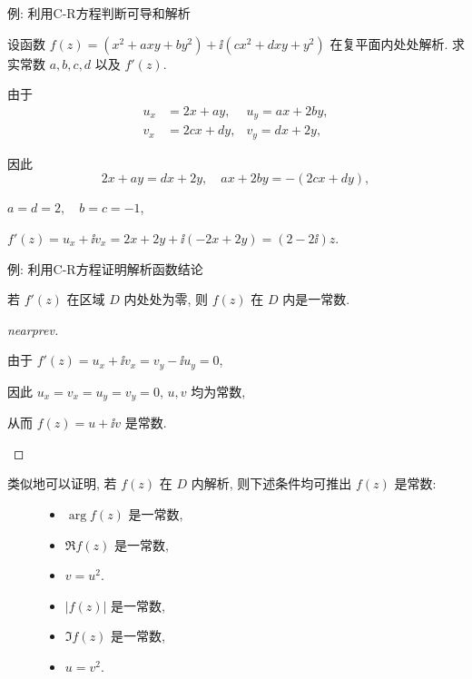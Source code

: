\begin{frame}{例: 利用C-R方程判断可导和解析}
	\onslide<+->
	\begin{example}[nearnext]
		设函数 $f(z)=(x^2+axy+by^2)+\ii(cx^2+dxy+y^2)$ 在复平面内处处解析. 求实常数 $a,b,c,d$ 以及 $f'(z)$.
	\end{example}
	\onslide<+->
	\begin{solution}[nearprev]
		\begin{itemize*}
			\item 由于
			\bigdel
			\begin{align*}
				u_x&=2x+ay,&u_y=ax+2by,\\
				v_x&=2cx+dy,&v_y=dx+2y,
			\end{align*}
			\item 因此
			\[
				2x+ay=dx+2y,\quad ax+2by=-(2cx+dy),
			\]
			\item \centering $a=d=2,\quad b=c=-1$,
			\item \centering $f'(z)=u_x+\ii v_x=2x+2y+\ii(-2x+2y)=(2-2\ii)z$.
		\end{itemize*}
	\end{solution}
\end{frame}


\begin{frame}[<*>]{例: 利用C-R方程证明解析函数结论}
	\onslide<+->
	\begin{example}[nearnext]
		若 $f'(z)$ 在区域 $D$ 内处处为零, 则 $f(z)$ 在 $D$ 内是一常数.
	\end{example}
	\onslide<+->
	\begin{proof}[nearprev]
		\begin{itemize*}
			\item 由于 $f'(z)=u_x+\ii v_x=v_y-\ii u_y=0$,
			\item 因此 $u_x=v_x=u_y=v_y=0$, $u,v$ 均为常数,
			\item 从而 $f(z)=u+\ii v$ 是常数.\qedhere
		\end{itemize*}
	\end{proof}

	\onslide<+->
	类似地可以证明, 若 $f(z)$ 在 $D$ 内解析, 则下述条件均可推出 $f(z)$ 是常数:
	\onslide<+->
	\begin{figure}[hbpt]
		\begin{minipage}{0.48\textwidth}
			\begin{itemize}
				\item $\arg{f(z)}$ 是一常数,
				\item $\Re{f(z)}$ 是一常数,
				\item $v=u^2$.
			\end{itemize}
		\end{minipage}
		\begin{minipage}{0.48\textwidth}
			\begin{itemize}
				\item $|f(z)|$ 是一常数,
				\item $\Im{f(z)}$ 是一常数,
				\item $u=v^2$.
			\end{itemize}
		\end{minipage}
	\end{figure}
\end{frame}


